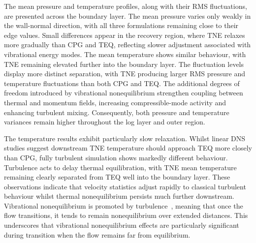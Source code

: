 The mean pressure and temperature profiles, along with their RMS fluctuations, are presented across the boundary layer. The mean pressure varies only weakly in the wall-normal direction, with all three formulations remaining close to their edge values. Small differences appear in the recovery region, where \gls{TNE} relaxes more gradually than \gls{CPG} and \gls{TEQ}, reflecting slower adjustment associated with vibrational energy modes. The mean temperature shows similar behaviour, with \gls{TNE} remaining elevated further into the boundary layer. The fluctuation levels display more distinct separation, with \gls{TNE} producing larger RMS pressure and temperature fluctuations than both \gls{CPG} and \gls{TEQ}. The additional degrees of freedom introduced by vibrational nonequilibrium strengthen coupling between thermal and momentum fields, increasing compressible-mode activity and enhancing turbulent mixing. Consequently, both pressure and temperature variances remain higher throughout the log layer and outer region.

The temperature results exhibit particularly slow relaxation. Whilst linear DNS studies suggest downstream \gls{TNE} temperature should approach \gls{TEQ} more closely than \gls{CPG}, fully turbulent simulation shows markedly different behaviour. Turbulence acts to delay thermal equilibration, with \gls{TNE} mean temperature remaining clearly separated from \gls{TEQ} well into the boundary layer. These observations indicate that velocity statistics adjust rapidly to classical turbulent behaviour whilst thermal nonequilibrium persists much further downstream. Vibrational nonequilibrium is promoted by turbulence~\citep{FievetEtAl2019}, meaning that once the flow transitions, it tends to remain nonequilibrium over extended distances. This underscores that vibrational nonequilibrium effects are particularly significant during transition when the flow remains far from equilibrium.







